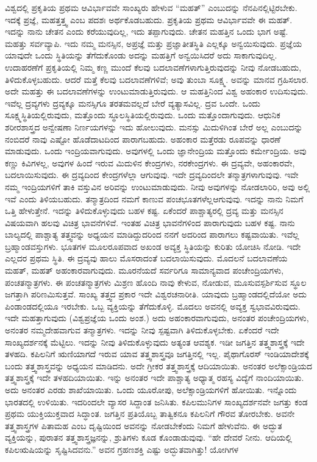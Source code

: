 ವಿಶ್ವದಲ್ಲಿ ಪ್ರಕೃತಿಯ ಪ್ರಥಮ ಆವಿರ್ಭಾವವೇ ಸಾಂಖ್ಯರು ಹೇಳುವ “ಮಹತ್'' ಎಂಬುದನ್ನು ನೆನಪಿನಲ್ಲಿಟ್ಟಿರಬೇಕು. ಇದಕ್ಕೆ ಪ್ರಜ್ಞೆ, ಮಹತ್ತತ್ತ್ವ ಎಂಬ ಪದಶಃ ಅರ್ಥಕೊಡಬಹುದು. ಪ್ರಕೃತಿಯ ಪ್ರಥಮ ಆವಿರ್ಭಾವವೇ ಈ ಮಹತ್. ಇದನ್ನು ನಾನು ಚೇತನ ಎಂದು ಕರೆಯುವುದಿಲ್ಲ, ಇದು ತಪ್ಪಾಗುವುದು. ಚೇತನ ಮಹತ್ತಿನ ಒಂದು ಭಾಗ ಅಷ್ಟೆ. ಮಹತ್ತು ಸರ್ವವ್ಯಾಪಿ. ಇದು ನಮ್ಮ ಮನಸ್ಸಿನ, ಅಪ್ರಜ್ಞೆ ಮತ್ತು ಪ್ರಜ್ಞಾತೀತಸ್ಥಿತಿ ಎಲ್ಲಕ್ಕೂ ಅನ್ವಯಿಸುವುದು. ಪ್ರಜ್ಞೆಯ ಯಾವುದೇ ಒಂದು ಸ್ಥಿತಿಯನ್ನು ತೆಗೆದುಕೊಂಡು ಅದನ್ನು ಮಹತ್ತಿಗೆ ಅನ್ವಯಿಸಿದರೆ ಅದು ಸಾಕಾಗುವುದಿಲ್ಲ. ಉದಾಹರಣೆಗೆ ಪ್ರಕೃತಿಯಲ್ಲಿ ನಿಮ್ಮ ಕಣ್ಣ ಮುಂದೆ ಕೆಲವು ಬದಲಾವಣೆಗಳಾಗುತ್ತಿರುವುದನ್ನು ನೀವು ನೋಡಬಹುದು, ತಿಳಿದುಕೊಳ್ಳಬಹುದು. ಆದರೆ ಮತ್ತೆ ಕೆಲವು ಬದಲಾವಣೆಗಳಿವೆ; ಅವು ತುಂಬಾ ಸೂಕ್ಷ್ಮ. ಅವನ್ನು ಮಾನವ ಗ್ರಹಿಸಲಾರ. ಅದೇ ಮಹತ್ತು ಈ ಬದಲಾವಣೆಗಳನ್ನು ಉಂಟುಮಾಡುತ್ತಿರುವುದು. ಆ ಮಹತ್ತಿನಿಂದ ವಿಶ್ವ ಅಹಂಕಾರ ಉದಿಸುವುದು. ಇವೆಲ್ಲ ದ್ರವ್ಯಗಳು ದ್ರವ್ಯಕ್ಕೂ ಮನಸ್ಸಿಗೂ ತರತಮವಲ್ಲದೆ ಬೇರೆ ವ್ಯತ್ಯಾಸವಿಲ್ಲ. ದ್ರವ ಒಂದೇ. ಒಂದು ಸೂಕ್ಷ್ಮಸ್ಥಿತಿಯಲ್ಲಿರುವುದು, ಮತ್ತೊಂದು ಸ್ಥೂಲಸ್ಥಿತಿಯಲ್ಲಿರುವುದು. ಒಂದು ಮತ್ತೊಂದಾಗುವುದು. ಆಧುನಿಕ ಶರೀರಶಾಸ್ತ್ರದ ಅನ್ವೇಷಣಾ ನಿರ್ಣಯಗಳನ್ನು ಇದು ಹೋಲುವುದು. ಮನಸ್ಸು ಮಿದುಳಿಗಿಂತ ಬೇರೆ ಅಲ್ಲ ಎಂಬುದನ್ನು ನಂಬಿದರೆ ನಾವು ಎಷ್ಟೋ ಹೊಡೆದಾಟದಿಂದ ಪಾರಾಗಬಹುದು. ಅಹಂಕಾರ ಮತ್ತೆರಡು ರೂಪವನ್ನು ಧಾರಣೆ ಮಾಡುವುದು. ಒಂದು ಇಂದ್ರಿಯವಾಗುವುದು. ಅವುಗಳಲ್ಲಿ ಒಂದು ಜ್ಞಾನೇಂದ್ರಿಯ ಮತ್ತೊಂದು ಕರ್ಮೇಂದ್ರಿಯ. ಅವು ಕಣ್ಣು ಕಿವಿಗಳಲ್ಲ, ಅವುಗಳ ಹಿಂದೆ ಇರುವ ಮಿದುಳಿನ ಕೇಂದ್ರಗಳು, ನರಕೇಂದ್ರಗಳು. ಈ ದ್ರವ್ಯವೇ, ಅಹಂಕಾರವೇ, ಬದಲಾಯಿಸುವುದು. ಈ ದ್ರವ್ಯದಿಂದ ಕೇಂದ್ರಗಳೆಲ್ಲಾ ಆಗುವುವು. ಇದೇ ದ್ರವ್ಯದಿಂದಲೇ ತನ್ಮಾತ್ರಗಳಾಗುವುವು. ಇವೇ ನಮ್ಮ ಇಂದ್ರಿಯಗಳಿಗೆ ತಾಕಿ ವಸ್ತುವಿನ ಅರಿವನ್ನು ಉಂಟುಮಾಡುವುದು. ನೀವು ಅವುಗಳನ್ನು ನೋಡಲಾರಿರಿ, ಅವು ಅಲ್ಲಿ ಇವೆ ಎಂದು ತಿಳಿಯಬಹುದು. ತನ್ಮಾತ್ರದಿಂದ ನಮಗೆ ಕಾಣುವ ಪಂಚಭೂತಗಳೆಲ್ಲ\break ಆಗುವುವು. ಇದನ್ನು ನಾನು ನಿಮಗೆ ಒತ್ತಿ ಹೇಳುತ್ತೇನೆ. ಇದನ್ನು ತಿಳಿದುಕೊಳ್ಳುವುದು ಬಹಳ ಕಷ್ಟ. ಏಕೆಂದರೆ ಪಾಶ್ಚಾತ್ಯರಲ್ಲಿ ದ್ರವ್ಯ ಮತ್ತು ಮನಸ್ಸಿನ ವಿಷಯವಾಗಿ ಹಲವು ವಿಚಿತ್ರ ಭಾವನೆಗಳಿವೆ. ಇಂತಹ ವಿಚಿತ್ರ ಭಾವನೆಗಳಿಂದ ಪಾರಾಗುವುದು ಬಹಳ ಕಷ್ಟ. ನಾನು ಬಾಲ್ಯದಲ್ಲಿ ಪಾಶ್ಚಾತ್ಯ ತತ್ತ್ವವನ್ನು ಅಧ್ಯಯನ ಮಾಡಿದ್ದುದರಿಂದ ನನಗೆ ಅದರಿಂದ ಪಾರಾಗಲು ಕಷ್ಟವಾಯಿತು. ಇವೆಲ್ಲ ಬ್ರಹ್ಮಾಂಡವಸ್ತುಗಳು. ಭೂತಗಳ ಮೂಲರೂಪವಾದ ಅಖಂಡ ಅವ್ಯಕ್ತ ಸ್ಥಿತಿಯನ್ನು ಕುರಿತು ಯೋಚಿಸಿ ನೋಡಿ. ಇದೇ ಎಲ್ಲದರ ಪ್ರಥಮ ಸ್ಥಿತಿ. ಈ ದ್ರವ್ಯವು ಹಾಲು ಮೊಸರಾದಂತೆ ಬದಲಾಯಿಸುವುದು. ಮೊದಲನೆ ಬದಲಾವಣೆಯ ಮಹತ್, ಮಹತ್ ಅಹಂಕಾರವಾಗುವುದು. ಮೂರನೆಯದೆ ಸರ್ವರಿಗೂ ಸಾಮಾನ್ಯವಾದ ಪಂಚೇಂದ್ರಿಯಗಳು, ಪಂಚತನ್ಮಾತ್ರಗಳು. ಈ ಪಂಚತನ್ಮಾತ್ರಗಳು ಮಿಶ್ರಣ ಹೊಂದಿ ನಾವು ಕೇಳುವ, ನೋಡುವ, ಮೂಸುವ\break ಸ್ಪರ್ಶಿಸುವ ಸ್ಥೂಲ ಜಗತ್ತಾಗಿ ಪರಿಣಮಿಸುತ್ತವೆ. ಸಾಂಖ್ಯ ತತ್ತ್ವದ ಪ್ರಕಾರ ಇದೇ ವಿಶ್ವರಚನಾರೀತಿ. ಯಾವುದು ಬ್ರಹ್ಮಾಂಡದಲ್ಲಿದೆಯೋ ಅದು ಪಿಂಡಾಂಡದಲ್ಲಿಯೂ ಇರಬೇಕು. ಒಬ್ಬ ವ್ಯಕ್ತಿಯನ್ನು ತೆಗೆದುಕೊಳ್ಳಿ. ಮೊದಲು ಅವನಲ್ಲಿ ಅವ್ಯಕ್ತ ಸ್ವಭಾವವಿರುವುದು. ಇದೇ ಮಹತ್ತಾಗುವುದು (ವಿಶ್ವಪ್ರಜ್ಞೆಯ ಒಂದು ಅಂಶ.) ಅದು ಅಹಂಕಾರವಾಗುವುದು, ಅನಂತರ ಪಂಚೇಂದ್ರಿಯಗಳು, ಅನಂತರ ನಮ್ಮದೇಹವಾಗುವ ತನ್ಮಾತ್ರಗಳು. ಇದನ್ನು ನೀವು ಸ್ಪಷ್ಟವಾಗಿ ತಿಳಿದುಕೊಳ್ಳಬೇಕು. ಏಕೆಂದರೆ ಇದೇ ಸಾಂಖ್ಯದರ್ಶನಕ್ಕೆ ಮೆಟ್ಟಿಲು. ಇದನ್ನು ನೀವು ತಿಳಿದುಕೊಳ್ಳುವುದು ಅತ್ಯಂತ ಆವಶ್ಯಕ. ಇಡೀ ಜಗತ್ತಿನ ತತ್ತ್ವಶಾಸ್ತ್ರಕ್ಕೆ ಇದೇ ತಳಹದಿ. ಕಪಿಲನಿಗೆ ಋಣಿಯಾಗದೆ ಇರುವ ಯಾವ ತತ್ತ್ವಶಾಸ್ತ್ರವೂ ಜಗತ್ತಿನಲ್ಲಿ ಇಲ್ಲ. ಪೈಥಾಗೊರಸ್ ಇಂಡಿಯಾದೇಶಕ್ಕೆ ಬಂದು ತತ್ತ್ವಶಾಸ್ತ್ರವನ್ನು ಅಧ್ಯಯನ ಮಾಡಿದನು. ಅದೇ ಗ್ರೀಕರ ತತ್ತ್ವಶಾಸ್ತ್ರಕ್ಕೆ ಆದಿಯಾಯಿತು. ಅನಂತರ ಅಲೆಕ್ಸಾಂಡ್ರಿಯದ ತತ್ತ್ವಶಾಸ್ತ್ರಕ್ಕೆ ಇದೇ ತಳಹದಿಯಾಯಿತು. ಇನ್ನು ಅನಂತರ ಇದೇ ಪಾಶ್ಚಾತ್ಯ ಅಧ್ಯಾತ್ಮ ರಹಸ್ಯ ವಿದ್ಯೆಗೆ ನಾಂದಿಯಾಯಿತು. ಅದು ಅನಂತರ ಎರಡು ಶಾಖೆಯಾಯಿತು. ಒಂದು ಯೂರೋಪು, ಅಲೆಕ್ಸಾಂಡ್ರಿಯಗಳಿಗೆ ಹೋಯಿತು. ಇನ್ನೊಂದು ಭಾರತದಲ್ಲಿ ಉಳಿಯಿತು. ಇದರಿಂದಲೇ ವ್ಯಾಸರ ಸಿದ್ದಾಂತ ಜನಿಸಿತು. ಕಪಿಲಮುನಿಗಳ ಸಾಂಖ್ಯದರ್ಶನವೇ ಜಗತ್ತು ಕಂಡ ಪ್ರಥಮ ಯುಕ್ತಿಯುಕ್ತವಾದ ಸಿದ್ಧಾಂತ. ಜಗತ್ತಿನ ಪ್ರತಿಯೊಬ್ಬ ತಾತ್ವಿಕನೂ ಕಪಿಲನಿಗೆ ಗೌರವ ತೋರಬೇಕು. ಅವನೇ ತತ್ತ್ವಶಾಸ್ತ್ರಗಳ ಪಿತಾಮಹ ಎಂಬ ದೃಷ್ಟಿಯಿಂದ ಅವನನ್ನು ನೋಡಬೇಕೆಂದು ನಿಮಗೆ ಹೇಳುವೆನು. ಈ ಅದ್ಭುತ ವ್ಯಕ್ತಿಯನ್ನು, ಪುರಾತನ ತತ್ತ್ವಶಾಸ್ತ್ರಜ್ಞನನ್ನು, ಶ್ರುತಿಗಳು ಕೂಡ ಕೊಂಡಾಡುವುವು. “ಹೇ ದೇವರೆ ನೀನು. ಆದಿಯಲ್ಲಿ ಕಪಿಲಋಷಿಯನ್ನು ಸೃಷ್ಟಿಸಿದವನು.'' ಅವನ ಗ್ರಹಣಶಕ್ತಿ ಎಷ್ಟು ಅದ್ಭುತವಾಗಿತ್ತು! ಯೋಗಿಗಳ 